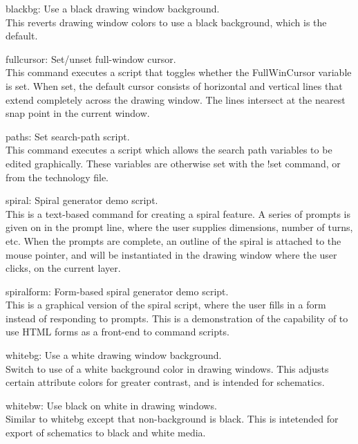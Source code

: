 \begin{description}
\item{\cb blackbg}: Use a black drawing window background.\\
This reverts drawing window colors to use a black background,
which is the default.

\item{\cb fullcursor}: Set/unset full-window cursor.\\
This command executes a script that toggles whether the {\et
FullWinCursor} variable is set.  When set, the default cursor consists
of horizontal and vertical lines that extend completely across the
drawing window.  The lines intersect at the nearest snap point in the
current window.

\item{\cb paths}: Set search-path script.\\
This command executes a script which allows the search path variables
to be edited graphically.  These variables are otherwise set with the
{\cb !set} command, or from the technology file.

\item{\cb spiral}: Spiral generator demo script.\\
This is a text-based command for creating a spiral feature.  A series
of prompts is given on in the prompt line, where the user supplies
dimensions, number of turns, etc.  When the prompts are complete, an
outline of the spiral is attached to the mouse pointer, and will be
instantiated in the drawing window where the user clicks, on the
current layer.

\item{\cb spiralform}: Form-based spiral generator demo script.\\
This is a graphical version of the {\cb spiral} script, where the user
fills in a form instead of responding to prompts.  This is a
demonstration of the capability of {\Xic} to use HTML forms as a
front-end to command scripts.

\item{\cb whitebg}: Use a white drawing window background.\\
Switch to use of a white background color in drawing windows.
This adjusts certain attribute colors for greater contrast,
and is intended for schematics.

\item{\cb whitebw}: Use black on white in drawing windows.\\
    Similar to {\cb whitebg} except that non-background is black.
This is intetended for export of schematics to black and white
media.


\end{description}
